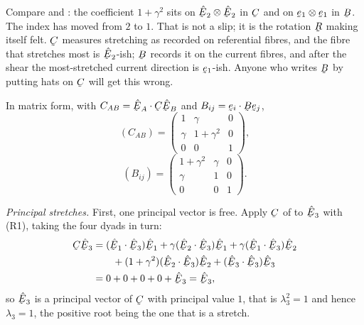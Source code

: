 \begin{remark}
\label{rem:CnotB}
Compare  and : the coefficient $1+\gamma^{2}$ sits on
$\hbE_{2}\otimes\hbE_{2}$ in $\bC$ and on $\be_{1}\otimes\be_{1}$ in
$\bB$. The index has moved from $2$ to $1$. That is not a slip; it is the
rotation $\bR$ making itself felt. $\bC$ measures stretching as recorded
on referential fibres, and the fibre that stretches most is
$\hbE_{2}$-ish; $\bB$ records it on the current fibres, and after the
shear the most-stretched current direction is $\be_{1}$-ish. Anyone who
writes $\bB$ by putting hats on $\bC$ will get this wrong.
\end{remark}

In matrix form, with $C_{AB}=\ip{\hbE_{A}}{\bC\hbE_{B}}$ and
$B_{ij}=\ip{\be_{i}}{\bB\be_{j}}$,
\begin{equation}
   (C_{AB})=\begin{pmatrix}1&\gamma&0\\ \gamma&1+\gamma^{2}&0\\
            0&0&1\end{pmatrix},
   \tag{3.55}\label{eq:3.55}
\end{equation}
\begin{equation}
   (B_{ij})=\begin{pmatrix}1+\gamma^{2}&\gamma&0\\ \gamma&1&0\\
            0&0&1\end{pmatrix}.
   \tag{3.56}\label{eq:3.56}
\end{equation}

\smallskip
\noindent\emph{Principal stretches.} First, one principal vector is free.
Apply $\bC$ of  to $\hbE_{3}$ with (R1), taking the four dyads in
turn:
\[
\begin{aligned}
   \bC\hbE_{3}
   &=(\ip{\hbE_{1}}{\hbE_{3}})\hbE_{1}
     +\gamma(\ip{\hbE_{2}}{\hbE_{3}})\hbE_{1}
     +\gamma(\ip{\hbE_{1}}{\hbE_{3}})\hbE_{2}\\
   &\qquad+(1+\gamma^{2})(\ip{\hbE_{2}}{\hbE_{3}})\hbE_{2}
     +(\ip{\hbE_{3}}{\hbE_{3}})\hbE_{3}\\
   &=0+0+0+0+\hbE_{3}=\hbE_{3},
\end{aligned}
\]
so $\hbE_{3}$ is a principal vector of $\bC$ with principal value $1$, that
is $\lambda_{3}^{2}=1$ and hence $\lambda_{3}=1$, the positive root being
the one that is a stretch.

